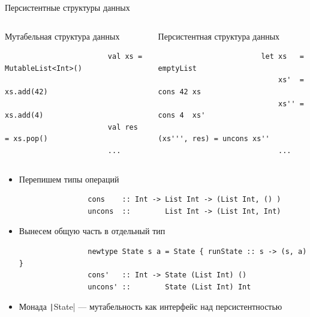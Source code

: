     \begin{frame}[fragile]{Персистентные структуры данных}
        \vspace{-0.5em}
        \vspace{-1em}
        \begin{columns}[onlytextwidth]
            \begin{column}[t]{0.485\textwidth}
                \begin{block}{Мутабельная структура данных}
                    \begin{verbatim}
                        val xs = MutableList<Int>()
                        xs.add(42)
                        xs.add(4)
                        val res = xs.pop()
                        ...
                    \end{verbatim}
                \end{block}
            \end{column}\hfill%
            \begin{column}[t]{0.485\textwidth}
                \begin{block}{Персистентная структура данных}
                    \begin{verbatim}
                        let xs   = emptyList
                            xs'  = cons 42 xs
                            xs'' = cons 4  xs'
                            (xs''', res) = uncons xs''
                            ...
                    \end{verbatim}
                \end{block}
            \end{column}
        \end{columns}
        \vspace{0.5em}
        \begin{itemize}
            \item Перепишем типы операций
            \begin{verbatim}
                cons    :: Int -> List Int -> (List Int, () )
                uncons  ::        List Int -> (List Int, Int)
            \end{verbatim}
            \item Вынесем общую часть в отдельный тип
            \begin{verbatim}
                newtype State s a = State { runState :: s -> (s, a) }
                cons'   :: Int -> State (List Int) ()
                uncons' ::        State (List Int) Int
            \end{verbatim}
            \item Монада \texttt|State| --- мутабельность как интерфейс над персистентностью
        \end{itemize}
    \end{frame}

